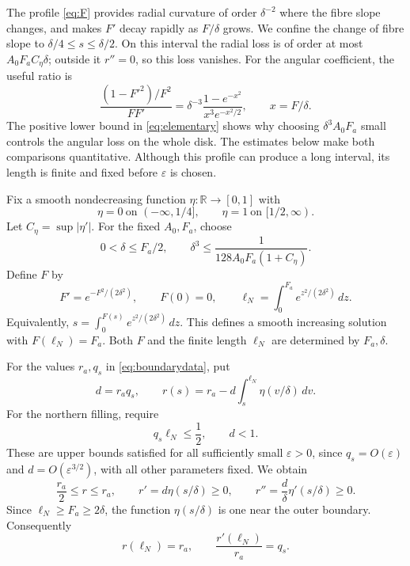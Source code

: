 \documentclass[12pt]{amsart}
\numberwithin{equation}{section}
\theoremstyle{remark}
\newcommand{\Rr}{\mathbb R}
\newcommand{\eps}{\varepsilon}
\begin{document}
The profile \eqref{eq:F} provides radial curvature of order
\(\delta^{-2}\) where the fibre slope changes, and makes \(F'\)
decay rapidly as \(F/\delta\) grows. We confine the change of
fibre slope to \(\delta/4\le s\le\delta/2\). On this interval
the radial loss is of order at most \(A_0F_aC_\eta\delta\);
outside it \(r''=0\), so this loss vanishes. For the angular
coefficient, the useful ratio is
\[
 \frac{(1-F'^2)/F^2}{FF'}
 =\delta^{-3}\frac{1-e^{-x^2}}{x^3e^{-x^2/2}},
 \qquad x=F/\delta.
\]
The positive lower bound in \eqref{eq:elementary} shows why
choosing \(\delta^3A_0F_a\) small controls the angular loss on
the whole disk. The estimates below make both comparisons
quantitative. Although this profile can produce a long interval,
its length is finite and fixed before \(\eps\) is chosen.

Fix a smooth nondecreasing function \(\eta:\Rr\to[0,1]\) with
\[
\eta=0\ \text{on }(-\infty,1/4],\qquad
\eta=1\ \text{on }[1/2,\infty).
\]
Let \(C_\eta=\sup|\eta'|\). For the fixed \(A_0,F_a\), choose
\begin{equation}\label{eq:delta}
0<\delta\le F_a/2,\qquad
\delta^3\le\frac{1}{128A_0F_a(1+C_\eta)}.
\end{equation}
Define \(F\) by
\begin{equation}\label{eq:F}
F'=e^{-F^2/(2\delta^2)},\qquad F(0)=0,
\qquad
\ell_N=\int_0^{F_a}e^{z^2/(2\delta^2)}\,dz.
\end{equation}
Equivalently, \(s=\int_0^{F(s)}e^{z^2/(2\delta^2)}\,dz\).
This defines a smooth increasing solution with
\(F(\ell_N)=F_a\). Both \(F\) and the finite length \(\ell_N\)
are determined by \(F_a,\delta\).

For the values \(r_a,q_s\) in \eqref{eq:boundarydata}, put
\begin{equation}\label{eq:r}
d=r_aq_s,\qquad
r(s)=r_a-d\int_s^{\ell_N}\eta(v/\delta)\,dv.
\end{equation}
For the northern filling, require
\begin{equation}\label{eq:epsnorth}
q_s\ell_N\le\frac12,\qquad d<1.
\end{equation}
These are upper bounds satisfied for all sufficiently small
\(\eps>0\), since \(q_s=O(\eps)\) and \(d=O(\eps^{3/2})\), with
all other parameters fixed. We obtain
\begin{equation}\label{eq:rproperties}
\frac{r_a}{2}\le r\le r_a,\qquad
r'=d\eta(s/\delta)\ge0,\qquad
r''=\frac d\delta\eta'(s/\delta)\ge0.
\end{equation}
Since \(\ell_N\ge F_a\ge2\delta\), the function \(\eta(s/\delta)\)
is one near the outer boundary. Consequently
\begin{equation}\label{eq:rjet}
r(\ell_N)=r_a,\qquad \frac{r'(\ell_N)}{r_a}=q_s.
\end{equation}
\end{document}
